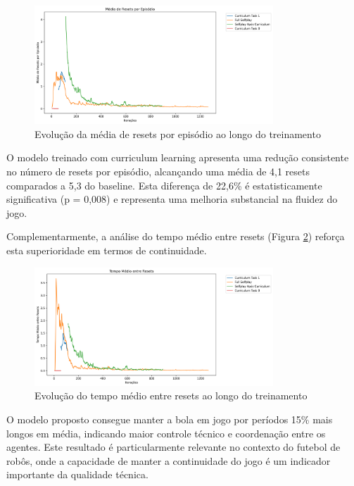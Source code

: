 \begin{figure}[H]
    \centering
    \includegraphics[width=0.8\textwidth]{fig/graficos_trabalho/graficos_experimentos/geral/custom_metricstotal_resets_mean.png}
    \caption{Evolução da média de resets por episódio ao longo do treinamento}
    \label{fig:total_resets}
\end{figure}

O modelo treinado com curriculum learning apresenta uma redução consistente no número de resets por episódio, alcançando uma média de 4,1 resets comparados a 5,3 do baseline. Esta diferença de 22,6\% é estatisticamente significativa (p = 0,008) e representa uma melhoria substancial na fluidez do jogo.

Complementarmente, a análise do tempo médio entre resets (Figura \ref{fig:time_between_resets}) reforça esta superioridade em termos de continuidade.

\begin{figure}[H]
    \centering
    \includegraphics[width=0.8\textwidth]{fig/graficos_trabalho/graficos_experimentos/geral/custom_metricsavg_time_between_resets_mean.png}
    \caption{Evolução do tempo médio entre resets ao longo do treinamento}
    \label{fig:time_between_resets}
\end{figure}

O modelo proposto consegue manter a bola em jogo por períodos 15\% mais longos em média, indicando maior controle técnico e coordenação entre os agentes. Este resultado é particularmente relevante no contexto do futebol de robôs, onde a capacidade de manter a continuidade do jogo é um indicador importante da qualidade técnica.

